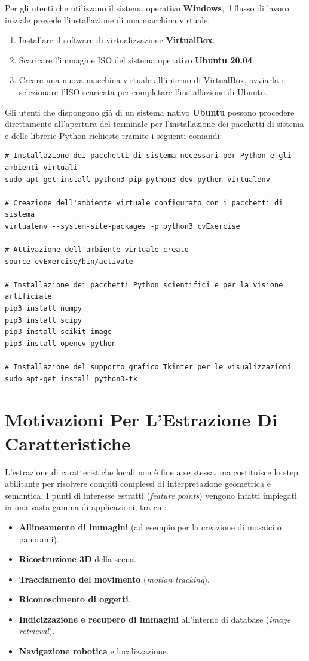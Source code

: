 ﻿\documentclass[11pt, a4paper]{article}
\begin{document}
Per gli utenti che utilizzano il sistema operativo \textbf{Windows}, il flusso di lavoro iniziale prevede l'installazione di una macchina virtuale:
\begin{enumerate}[noitemsep]
    \item Installare il software di virtualizzazione \textbf{VirtualBox}.
    \item Scaricare l'immagine ISO del sistema operativo \textbf{Ubuntu 20.04}.
    \item Creare una nuova macchina virtuale all'interno di VirtualBox, avviarla e selezionare l'ISO scaricata per completare l'installazione di Ubuntu.
\end{enumerate}

Gli utenti che dispongono già di un sistema nativo \textbf{Ubuntu} possono procedere direttamente all'apertura del terminale per l'installazione dei pacchetti di sistema e delle librerie Python richieste tramite i seguenti comandi:

\begin{verbatim}
# Installazione dei pacchetti di sistema necessari per Python e gli ambienti virtuali
sudo apt-get install python3-pip python3-dev python-virtualenv

# Creazione dell'ambiente virtuale configurato con i pacchetti di sistema
virtualenv --system-site-packages -p python3 cvExercise

# Attivazione dell'ambiente virtuale creato
source cvExercise/bin/activate

# Installazione dei pacchetti Python scientifici e per la visione artificiale
pip3 install numpy
pip3 install scipy
pip3 install scikit-image
pip3 install opencv-python

# Installazione del supporto grafico Tkinter per le visualizzazioni
sudo apt-get install python3-tk
\end{verbatim}

\newpage

\section{Motivazioni Per L'Estrazione Di Caratteristiche}

L'estrazione di caratteristiche locali non è fine a se stessa, ma costituisce lo step abilitante per risolvere compiti complessi di interpretazione geometrica e semantica. I punti di interesse estratti (\emph{feature points}) vengono infatti impiegati in una vasta gamma di applicazioni, tra cui:
\begin{itemize}[noitemsep]
    \item \textbf{Allineamento di immagini} (ad esempio per la creazione di mosaici o panorami).
    \item \textbf{Ricostruzione 3D} della scena.
    \item \textbf{Tracciamento del movimento} (\emph{motion tracking}).
    \item \textbf{Riconoscimento di oggetti}.
    \item \textbf{Indicizzazione e recupero di immagini} all'interno di database (\emph{image retrieval}).
    \item \textbf{Navigazione robotica} e localizzazione.
\end{itemize}
\end{document}
